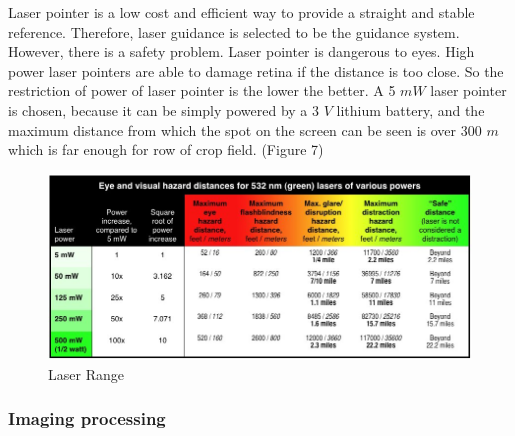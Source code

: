 \documentclass[12pt]{article}
\begin{document}
\begin{flushleft}
Laser pointer is a low cost and efficient way to provide a straight and stable reference. Therefore, laser guidance is selected to be the guidance system. However, there is a safety problem. Laser pointer is dangerous to eyes. High power laser pointers are able to damage retina if the distance is too close. So the restriction of power of laser pointer is the lower the better.  A 5 $mW$ laser pointer is chosen, because it can be simply powered by a 3 $V$ lithium battery, and the maximum distance from which the spot on the screen can be seen is over 300 $m$ which is far enough for row of crop field. (Figure 7)
\begin{figure}[ht!]
	\begin{center}
		\includegraphics[scale = 0.5]{laserrange.jpg}
		\caption{Laser Range}
	\end{center}
\end{figure}

\subsubsection{Imaging processing}





\end{flushleft}
\end{document}
